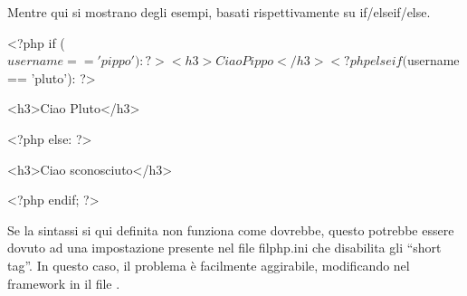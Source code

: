 Mentre qui si mostrano degli esempi, basati rispettivamente su if/elseif/else.

\begin{code}
<?php if ($username == 'pippo'): ?>

   <h3>Ciao Pippo</h3>

<?php elseif ($username == 'pluto'): ?>

   <h3>Ciao Pluto</h3>

<?php else: ?>

   <h3>Ciao sconosciuto</h3>

<?php endif; ?>
\end{code}

Se la sintassi si qui definita non funziona come dovrebbe, questo potrebbe essere dovuto ad una impostazione presente nel file fil{php.ini} che disabilita gli ``short tag''. In questo caso, il problema è facilmente aggirabile, modificando nel framework in il file .